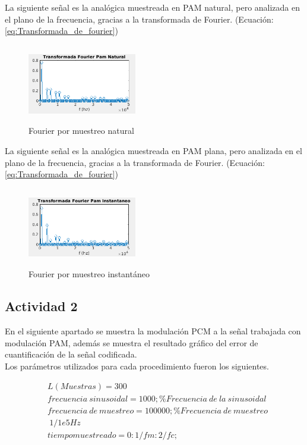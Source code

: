 La siguiente señal es la analógica muestreada en PAM natural, pero analizada en el plano de la frecuencia, gracias a la transformada de Fourier. (Ecuación:\ref{eq:Transformada_de_fourier})

\begin{figure}[H]
    \centering
        \includegraphics[height=130px, width=180px]{Imagenes/Actividad1/TFnatu.png}
    \caption{Fourier por muestreo natural}
    \label{fig:Fourier_por_muestre_natural}
\end{figure}

La siguiente señal es la analógica muestreada en PAM plana, pero analizada en el plano de la frecuencia, gracias a la transformada de Fourier. (Ecuación:\ref{eq:Transformada_de_fourier})
\begin{figure}[H]
    \centering
    \includegraphics[height=130px, width=180px]{Imagenes/Actividad1/TFplana.png}
    \caption{Fourier por muestreo instantáneo}
    \label{fig:Fourier_por_muestre_natural1}
\end{figure}



\subsection{Actividad 2}

En el siguiente apartado se muestra la modulación PCM a la señal trabajada con modulación PAM, además se muestra el resultado gráfico del error de cuantificación de la señal codificada.\\

Los parámetros utilizados para cada procedimiento fueron los siguientes.

\begin{equation} \label{eq:muestras_frecuencia_sinusoidal_muestreo_muestreado}
\begin{split} 
&L(Muestras) = 300 \\
&frecuencia\ sinusoidal=1000; \%Frecuencia\ de\ la\ sinusoidal \\
&frecuencia\ de\ muestreo=100000; \%Frecuencia\ de\ muestreo \\
&\ 1/1e5Hz \\
&tiempo muestreado=0:1/fm:2/fc;
\end{split} 
\end{equation}

